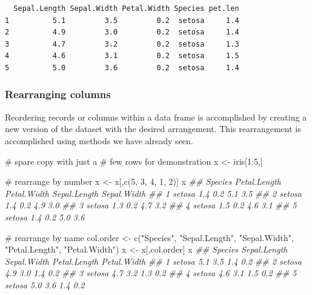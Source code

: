 \documentclass[
  13,
  letterpaper,
]{report}
\newenvironment{Shaded}{\begin{snugshade}}{\end{snugshade}}
\newcommand{\CommentTok}[1]{\textcolor[rgb]{0.37,0.37,0.37}{#1}}
\newcommand{\DecValTok}[1]{\textcolor[rgb]{0.68,0.00,0.00}{#1}}
\newcommand{\DocumentationTok}[1]{\textcolor[rgb]{0.37,0.37,0.37}{\textit{#1}}}
\newcommand{\FunctionTok}[1]{\textcolor[rgb]{0.28,0.35,0.67}{#1}}
\newcommand{\NormalTok}[1]{\textcolor[rgb]{0.00,0.23,0.31}{#1}}
\newcommand{\OtherTok}[1]{\textcolor[rgb]{0.00,0.23,0.31}{#1}}
\newcommand{\SpecialCharTok}[1]{\textcolor[rgb]{0.37,0.37,0.37}{#1}}
\newcommand{\StringTok}[1]{\textcolor[rgb]{0.13,0.47,0.30}{#1}}
\begin{document}
\begin{verbatim}
  Sepal.Length Sepal.Width Petal.Width Species pet.len
1          5.1         3.5         0.2  setosa     1.4
2          4.9         3.0         0.2  setosa     1.4
3          4.7         3.2         0.2  setosa     1.3
4          4.6         3.1         0.2  setosa     1.5
5          5.0         3.6         0.2  setosa     1.4
\end{verbatim}

\subsubsection{Rearranging columns}\label{sec-05-df-com-rearr}

Reordering records or columns within a data frame is accomplished by
creating a new version of the dataset with the desired arrangement. This
rearrangement is accomplished using methods we have already seen.

\begin{Shaded}
\begin{Highlighting}[]

\CommentTok{\# spare copy with just a }
\CommentTok{\# few rows for demonstration}
\NormalTok{x }\OtherTok{\textless{}{-}}\NormalTok{ iris[}\DecValTok{1}\SpecialCharTok{:}\DecValTok{5}\NormalTok{,] }

\CommentTok{\# rearrange by number}
\NormalTok{x }\OtherTok{\textless{}{-}}\NormalTok{ x[,}\FunctionTok{c}\NormalTok{(}\DecValTok{5}\NormalTok{, }\DecValTok{3}\NormalTok{, }\DecValTok{4}\NormalTok{, }\DecValTok{1}\NormalTok{, }\DecValTok{2}\NormalTok{)]}
\NormalTok{x}
\DocumentationTok{\#\#   Species Petal.Length Petal.Width Sepal.Length Sepal.Width}
\DocumentationTok{\#\# 1  setosa          1.4         0.2          5.1         3.5}
\DocumentationTok{\#\# 2  setosa          1.4         0.2          4.9         3.0}
\DocumentationTok{\#\# 3  setosa          1.3         0.2          4.7         3.2}
\DocumentationTok{\#\# 4  setosa          1.5         0.2          4.6         3.1}
\DocumentationTok{\#\# 5  setosa          1.4         0.2          5.0         3.6}

\CommentTok{\# rearrange by name}
\NormalTok{col.order }\OtherTok{\textless{}{-}} \FunctionTok{c}\NormalTok{(}\StringTok{"Species"}\NormalTok{, }\StringTok{"Sepal.Length"}\NormalTok{, }\StringTok{"Sepal.Width"}\NormalTok{, }
               \StringTok{"Petal.Length"}\NormalTok{, }\StringTok{"Petal.Width"}\NormalTok{)}
\NormalTok{x }\OtherTok{\textless{}{-}}\NormalTok{ x[,col.order]}
\NormalTok{x}
\DocumentationTok{\#\#   Species Sepal.Length Sepal.Width Petal.Length Petal.Width}
\DocumentationTok{\#\# 1  setosa          5.1         3.5          1.4         0.2}
\DocumentationTok{\#\# 2  setosa          4.9         3.0          1.4         0.2}
\DocumentationTok{\#\# 3  setosa          4.7         3.2          1.3         0.2}
\DocumentationTok{\#\# 4  setosa          4.6         3.1          1.5         0.2}
\DocumentationTok{\#\# 5  setosa          5.0         3.6          1.4         0.2}
\end{Highlighting}
\end{Shaded}
\end{document}
